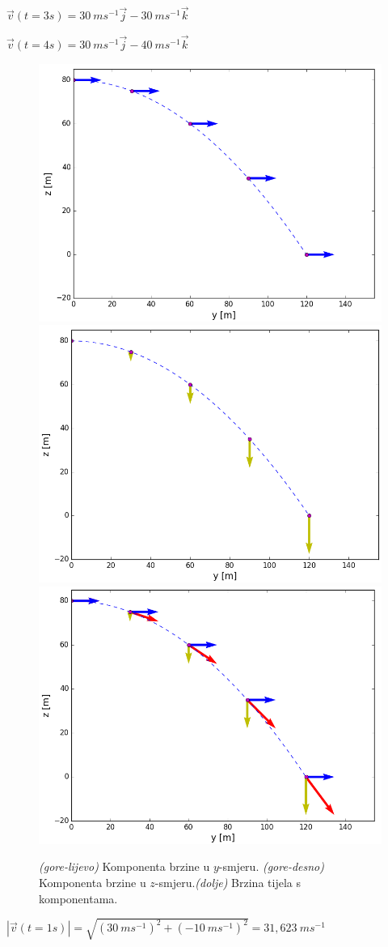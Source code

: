 \begin{enumerate}[label=\alph*)]
 $\vec{v}(t=3s)  =30\ ms^{-1}\vec{j}-30\ ms^{-1}\vec{k}$
  
 $\vec{v}(t=4s)  =30\ ms^{-1}\vec{j}-40\ ms^{-1}\vec{k}$
 
\begin{figure}
  \centering
  \includegraphics[width=0.4\linewidth]{02_Kinematika_materijalne_tocke/brzina_y.png}
  \centering
  \includegraphics[width=.4\linewidth]{02_Kinematika_materijalne_tocke/brzina_z.png}
\centering
  \includegraphics[width=.5\linewidth]{02_Kinematika_materijalne_tocke/brzina_ukupna.png}
\caption{\textit{(gore-lijevo)} Komponenta brzine u $y$-smjeru. \textit{(gore-desno)} Komponenta brzine u $z$-smjeru.\textit{(dolje)} Brzina tijela s komponentama.}
\end{figure}

$|\vec{v}(t=1s)|  = \sqrt{ (30\ ms^{-1})^2 + (-10\ ms^{-1})^2 } = 31,623\ ms^{-1} $


\end{enumerate}
